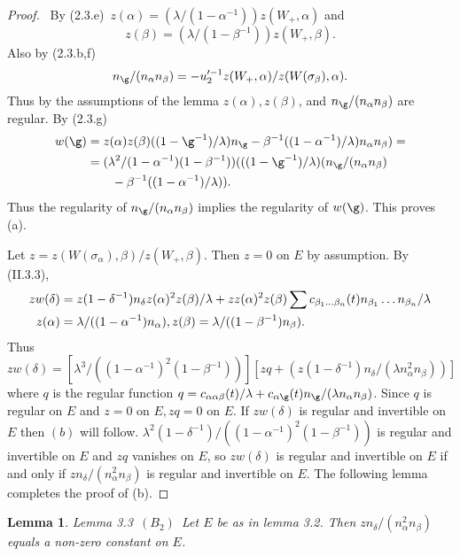 \documentclass{memo-l}
\newtheorem{lemma}[theorem]{Lemma}
\theoremstyle{definition}
\theoremstyle{remark}
\numberwithin{section}{chapter}
\numberwithin{equation}{chapter}
\begin{document}
\begin{proof} \   By (2.3.e)\  $z({\alpha}) = ({\lambda}/(1-{\alpha}^{-1}))z(W_{+},
{\alpha})$ and $$z({\beta})=({\lambda}/(1-{\beta}^{-1}))z(W_{+},{\beta}).$$
 Also by (2.3.b,f)
$$
n_{{\g}}/(n_{\alpha}n_{\beta}) = -u_{2}^{\prime-1}z(W_{+},
{\alpha})/z(W({\sigma}_{\beta}),{\alpha}) .
$$
Thus by the assumptions of the lemma $z({\alpha}), z({\beta})$, and
$n_{{\g}}/(n_{\alpha}n_{\beta})$ are regular.
 By (2.3.g)
$$
\aligned
w({\g}) &= z({\alpha})z({\beta})((1-{\g}^{-1})/{\lambda})n_{{\g}}
- {\beta}^{-1}((1-{\alpha}^{-1})/{\lambda})n_{\alpha}n_{\beta}) = \\
&= ({\lambda}^{2}/(1-{\alpha}^{-1})(1-{\beta}^{-1}))
(((1-{\g}^{-1})/{\lambda})(n_{{\g}}/(n_{\alpha}n_{\beta}) \\
&\quad\quad  - {\beta}^{-1}((1-{\alpha}^{-1})/{\lambda})).
\endaligned
$$
Thus the regularity of $n_{{\g}}/(n_{\alpha}n_{\beta})$ implies the
regularity of $w({\g})$.
 This proves (a).

   Let $z = z(W({\sigma}_{\alpha}),{\beta})/z(W_{+},{\beta})$.
 Then $z = 0$ on $E$ by assumption.
 By (II.3.3),
$$
\aligned
zw({\delta}) &= z(1-{\delta}^{-1})n_{{\delta}}z({\alpha})^{2}
z({\beta})/{\lambda} + zz({\alpha})^{2}z({\beta}) \sum
c_{\beta_1\ldots \beta_n}(t)n_{\beta_1}\ldots n_{\beta_n}/{\lambda}\\
z({\alpha}) &= {\lambda}/((1-{\alpha}^{-1})n_{\alpha}),
z({\beta}) = {\lambda}/((1-{\beta}^{-1})n_{\beta}).
\endaligned
$$
Thus
$$
zw({\delta}) = [{\lambda}^{3}/((1-{\alpha}^{-1})^{2}(1-{\beta}^{-1}))][zq +
(z(1-{\delta}^{-1})n_{{\delta}}/({\lambda}n_{\alpha}^{2}n_{\beta}))]
$$
where $q$ is the regular function $q = c_{{\alpha}{\alpha}{\beta}}(t)/{\lambda}
+ c_{{\alpha}{\g}}(t)n_{{\g}}/({\lambda}n_{\alpha}n_{\beta})$.
Since $q$ is regular on $E$ and $z = 0$ on $E, zq = 0$ on $E$.
If $zw({\delta})$ is regular and invertible on $E$ then $(b)$ will follow.
$\lambda^2(1-\delta^{-1})/((1-{\alpha}^{-1})^{2}(1-\beta^{-1}))$ is
regular and invertible on $E$ and $zq$ vanishes on $E$, so $zw({\delta})$ is
regular and invertible on $E$ if and only if $zn_{{\delta}}/(n_{\alpha}^{2}
n_{\beta})$ is regular and invertible on $E$.
 The following lemma completes the proof of (b).
\end{proof}

\medskip

\begin{lemma}{Lemma 3.3}\   $(B_{2})$\  Let $E$ be as in lemma 3.2.
 Then $zn_{{\delta}}/(n_{\alpha}^{2}n_{\beta})$ equals a non-zero constant
on $E$.
\end{lemma}
\end{document}
